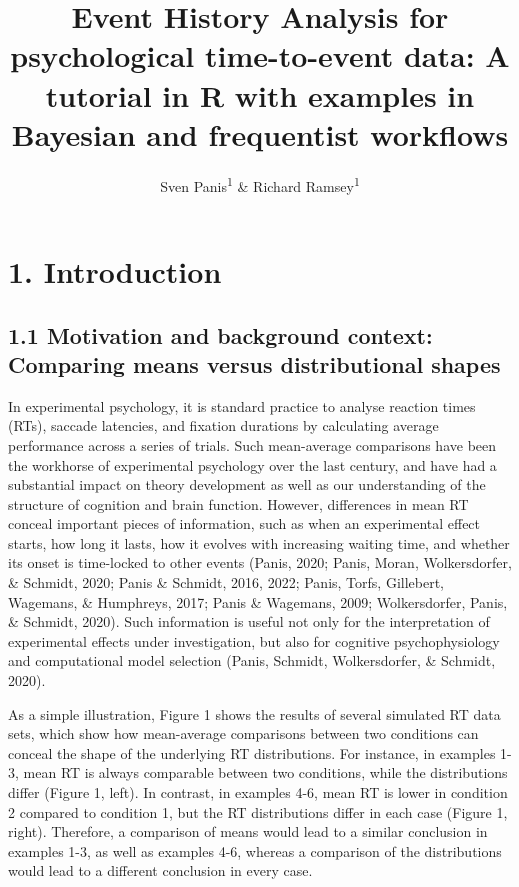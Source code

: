 \documentclass[
  man, donotrepeattitle,floatsintext]{apa6}
\title{Event History Analysis for psychological time-to-event data: A tutorial in R with examples in Bayesian and frequentist workflows}
\author{Sven Panis\textsuperscript{1} \& Richard Ramsey\textsuperscript{1}}
\date{}
\affiliation{\vspace{0.5cm}\textsuperscript{1} ETH Zürich}
\begin{document}
\maketitle

\section{1. Introduction}\label{introduction}

\subsection{1.1 Motivation and background context: Comparing means versus distributional shapes}\label{motivation-and-background-context-comparing-means-versus-distributional-shapes}

In experimental psychology, it is standard practice to analyse reaction times (RTs), saccade latencies, and fixation durations by calculating average performance across a series of trials. Such mean-average comparisons have been the workhorse of experimental psychology over the last century, and have had a substantial impact on theory development as well as our understanding of the structure of cognition and brain function. However, differences in mean RT conceal important pieces of information, such as when an experimental effect starts, how long it lasts, how it evolves with increasing waiting time, and whether its onset is time-locked to other events (Panis, 2020; Panis, Moran, Wolkersdorfer, \& Schmidt, 2020; Panis \& Schmidt, 2016, 2022; Panis, Torfs, Gillebert, Wagemans, \& Humphreys, 2017; Panis \& Wagemans, 2009; Wolkersdorfer, Panis, \& Schmidt, 2020). Such information is useful not only for the interpretation of experimental effects under investigation, but also for cognitive psychophysiology and computational model selection (Panis, Schmidt, Wolkersdorfer, \& Schmidt, 2020).

As a simple illustration, Figure 1 shows the results of several simulated RT data sets, which show how mean-average comparisons between two conditions can conceal the shape of the underlying RT distributions. For instance, in examples 1-3, mean RT is always comparable between two conditions, while the distributions differ (Figure 1, left). In contrast, in examples 4-6, mean RT is lower in condition 2 compared to condition 1, but the RT distributions differ in each case (Figure 1, right). Therefore, a comparison of means would lead to a similar conclusion in examples 1-3, as well as examples 4-6, whereas a comparison of the distributions would lead to a different conclusion in every case.
\end{document}
